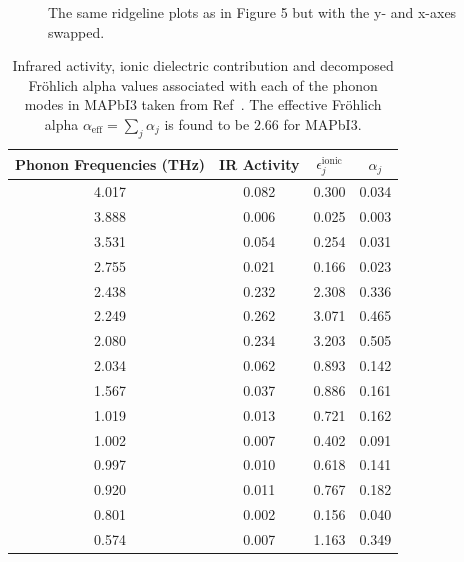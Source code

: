 \begin{figure}
{\begin{subfigure}[b]{.58\textwidth}
\end{subfigure}%
}
\caption{The same ridgeline plots as in Figure 5 but with the y- and x-axes swapped. }
\end{figure}


\begin{table}
\begin{center}
\begin{tabular}{||c|c|c|c||} 
\hline\hline
Phonon Frequencies (THz) & IR Activity & $\epsilon^{\text{ionic}}_j$ & $\alpha_j$ \\
\hline\hline
4.017 & 0.082 & 0.300 & 0.034 \\
\hline
3.888 & 0.006 & 0.025 & 0.003 \\
\hline
3.531 & 0.054 & 0.254 & 0.031 \\ 
\hline
2.755 & 0.021 & 0.166 & 0.023 \\
\hline
2.438 & 0.232 & 2.308 & 0.336 \\
\hline
2.249 & 0.262 & 3.071 & 0.465 \\
\hline
2.080 & 0.234 & 3.203 & 0.505 \\
\hline
2.034 & 0.062 & 0.893 & 0.142 \\
\hline
1.567 & 0.037 & 0.886 & 0.161 \\
\hline
1.019 & 0.013 & 0.721 & 0.162 \\
\hline
1.002 & 0.007 & 0.402 & 0.091 \\
\hline
0.997 & 0.010 & 0.618 & 0.141 \\
\hline
0.920 & 0.011 & 0.767 & 0.182 \\
\hline
0.801 & 0.002 & 0.156 & 0.040 \\
\hline
0.574 & 0.007 & 1.163 & 0.349 \\
\hline\hline
\end{tabular} \label{table:mapidata}
\caption{Infrared activity, ionic dielectric contribution and decomposed Fr\"ohlich alpha values associated with each of the phonon modes in MAPbI3 taken from Ref~\cite{brivio_lattice_2015}. The effective Fr\"ohlich alpha $\alpha_{\text{eff}} = \sum_j \alpha_j$ is found to be $2.66$ for MAPbI3.}
\end{center}
\end{table}

